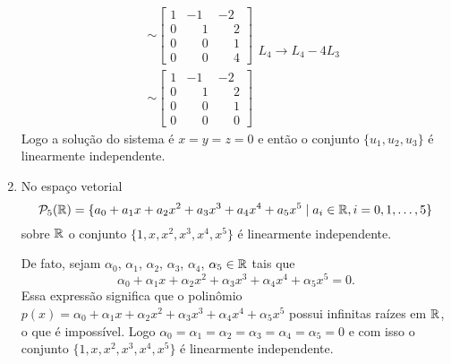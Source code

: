 \begin{exemplos}
\begin{enumerate}
\begin{solucao}
\begin{align*}
\begin{array}{l}
          \end{array}\\&\sim
          \begin{bmatrix}
            1 & -1 & -2\\
            0 & \phantom{-} 1 & \phantom{-} 2\\
            0 & \phantom{-} 0 & \phantom{-} 1\\
            0 & \phantom{-} 0 & \phantom{-} 4
          \end{bmatrix}
          \begin{array}{l}
            \phantom{x}\\\phantom{x}\\\phantom{x}\\L_4 \to L_4 - 4L_3
          \end{array}\\&\sim
          \begin{bmatrix}
            1 & -1 & -2\\
            0 & \phantom{-} 1 & \phantom{-} 2\\
            0 & \phantom{-} 0 & \phantom{-} 1\\
            0 & \phantom{-} 0 & \phantom{-} 0
          \end{bmatrix}
        \end{align*}
        Logo a solução do sistema é $x = y = z = 0$ e então o conjunto $\{u_1, u_2, u_3\}$ é linearmente independente.
      \end{solucao}

    \item No espaço vetorial
      \[
        \mathcal{P}_5(\mathbb{R}) = \{a_0 + a_1x + a_2x^2 + a_3x^3 + a_4x^4 + a_5x^5 \mid a_i \in \mathbb{R}, i = 0, 1, \dots, 5 \}
      \]
      sobre $\mathbb{R}$ o conjunto $\{1, x, x^2, x^3, x^4, x^5\}$ é linearmente independente.
      \begin{solucao}
        De fato, sejam $\alpha_0$, $\alpha_1$, $\alpha_2$, $\alpha_3$, $\alpha_4$, $\alpha_5 \in \mathbb{R}$ tais que
        \[
          \alpha_0 + \alpha_1x + \alpha_2x^2 + \alpha_3x^3 + \alpha_4x^4 + \alpha_5x^5 = 0.
        \]
        Essa expressão significa que o polinômio $p(x) = \alpha_0 + \alpha_1x + \alpha_2x^2 + \alpha_3x^3 + \alpha_4x^4 + \alpha_5x^5$ possui infinitas raízes em $\mathbb{R}$, o que é impossível. Logo
        $\alpha_0 = \alpha_1 = \alpha_2 = \alpha_3 = \alpha_4 = \alpha_5 = 0$ e com isso o conjunto $\{1, x, x^2, x^3, x^4, x^5\}$ é linearmente independente.
      \end{solucao}


\end{enumerate}
\end{exemplos}

